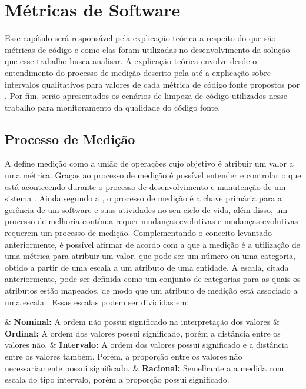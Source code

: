 \chapter{Métricas de Software}
\label{chap:metricas}

Esse capítulo será responsável pela explicação teórica a respeito do que são métricas de código e como elas foram utilizadas no desenvolvimento da solução que esse trabalho busca analisar. A explicação teórica envolve desde o entendimento do processo de medição descrito pela  até a explicação sobre intervalos qualitativos para valores de cada métrica de código fonte propostos por . Por fim, serão apresentados os cenários de limpeza de código utilizados nesse trabalho para monitoramento da qualidade do código fonte.

\section{Processo de Medição}

A  define medição como a união de operações cujo objetivo é atribuir um valor a uma métrica. Graças ao processo de medição é possível entender e controlar o que está acontecendo durante o processo de desenvolvimento e manutenção de um sistema . Ainda segundo a , o processo de medição é a chave primária para a gerência de um software e suas atividades no seu ciclo de vida, além disso, um processo de melhoria contínua requer mudanças evolutivas e mudanças evolutivas requerem um processo de medição.
	Complementando o conceito levantado anteriormente, é possível afirmar de acordo com a  que a medição é a utilização de uma métrica para  atribuir um valor, que pode ser um número ou uma categoria, obtido a partir de uma escala a um atributo de uma entidade.
	A escala, citada anteriormente, pode ser definida como um conjunto de categorias para as quais os atributos estão mapeados, de modo que um atributo de medição está associado a uma escala . Essas escalas podem ser divididas em:	

	\begin{easylist}[itemize]	
	
	& \textbf{Nominal:} A ordem não possui significado na interpretação dos valores \cite{Meirelles2013}
	& \textbf{Ordinal:} A ordem dos valores possui significado, porém a distância entre os valores não. \cite{Meirelles2013}
	& \textbf{Intervalo:}  A ordem dos valores possui significado e a distância entre os valores também. Porém, a proporção entre os valores não necessariamente possui significado. \cite{Meirelles2013}
	& \textbf{Racional:} Semelhante a a medida com escala do tipo intervalo, porém a proporção possui significado. \cite{Meirelles2013}

	\end{easylist}	
	
